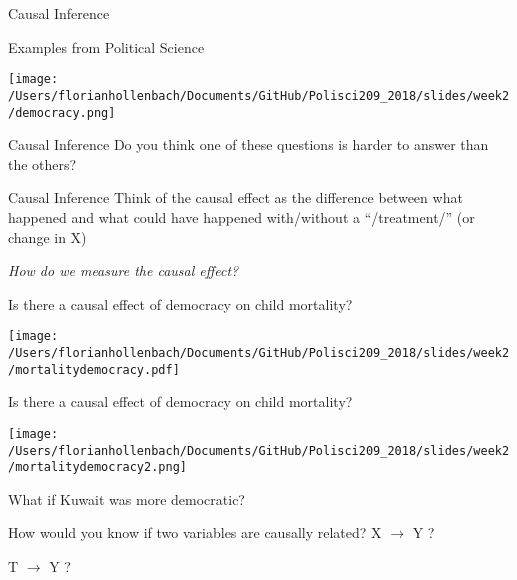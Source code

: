\documentclass[presentation]{beamer}
\begin{document}
\begin{frame}[label={sec:orgd339ef8}]{Causal Inference}
\begin{block}{Examples from Political Science}
\begin{center}
\texttt{[image: /Users/florianhollenbach/Documents/GitHub/Polisci209\_2018/slides/week2/democracy.png]}
\end{center}
\end{block}
\end{frame}

\begin{frame}[label={sec:org5b78263}]{Causal Inference}
Do you think one of these questions is harder to answer than the others?
\end{frame}

\begin{frame}[label={sec:org5ceadab}]{Causal Inference}
Think of the causal effect as the difference between what happened and what could have happened with/without a “/treatment/” (or change in X)

\emph{How do we measure the causal effect?}
\end{frame}

\begin{frame}[label={sec:orgbd83b13}]{Is there a causal effect of democracy on child mortality?}
\begin{center}
\texttt{[image: /Users/florianhollenbach/Documents/GitHub/Polisci209\_2018/slides/week2/mortalitydemocracy.pdf]}
\end{center}
\end{frame}

\begin{frame}[label={sec:org950d1c4}]{Is there a causal effect of democracy on child mortality?}
\begin{center}
\texttt{[image: /Users/florianhollenbach/Documents/GitHub/Polisci209\_2018/slides/week2/mortalitydemocracy2.png]}
\end{center}
\begin{block}{What if Kuwait was more democratic?}
\end{block}
\end{frame}

\begin{frame}[label={sec:orgec7ae3d}]{How would you know if two variables are causally related?}
\LARGE{X $\rightarrow$ Y ?}

\pause
\LARGE{T $\rightarrow$ Y ?}
\end{frame}
\end{document}

